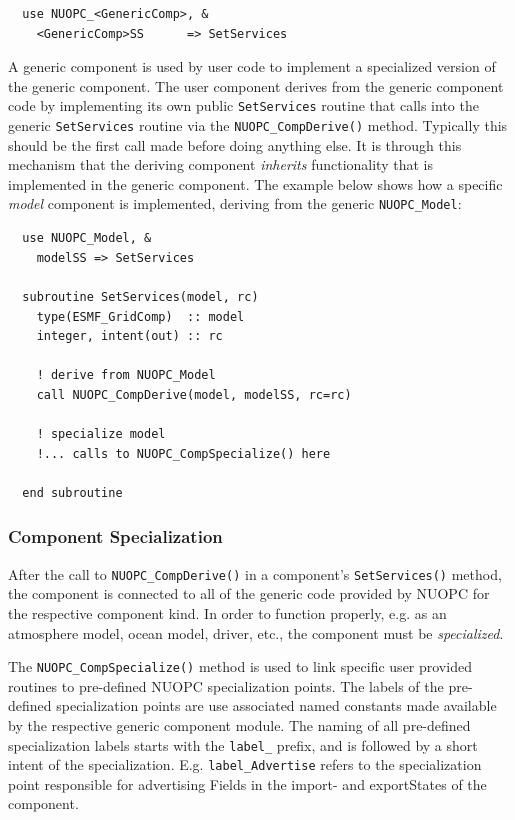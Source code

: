 \begin{verbatim}
  use NUOPC_<GenericComp>, &
    <GenericComp>SS      => SetServices
\end{verbatim}

A generic component is used by user code to implement a specialized version of the generic component. The user component derives from the generic component code by implementing its own public {\tt SetServices} routine that calls into the generic {\tt SetServices} routine via the {\tt NUOPC\_CompDerive()} method.
Typically this should be the first call made before doing anything else. It is through this mechanism that the deriving component {\em inherits} functionality that is implemented in the generic component. The example below shows how a specific {\em model} component is implemented, deriving from the generic {\tt NUOPC\_Model}:

\begin{verbatim}
  use NUOPC_Model, &
    modelSS => SetServices

  subroutine SetServices(model, rc)
    type(ESMF_GridComp)  :: model
    integer, intent(out) :: rc

    ! derive from NUOPC_Model
    call NUOPC_CompDerive(model, modelSS, rc=rc)

    ! specialize model
    !... calls to NUOPC_CompSpecialize() here
    
  end subroutine
\end{verbatim}

\subsubsection{Component Specialization}

After the call to {\tt NUOPC\_CompDerive()} in a component's {\tt SetServices()} method, the component is connected to all of the generic code provided by NUOPC for the respective component kind. In order to function properly, e.g. as an atmosphere model, ocean model, driver, etc., the component must be {\em specialized}.

The {\tt NUOPC\_CompSpecialize()} method is used to link specific user provided routines to pre-defined NUOPC specialization points. The labels of the pre-defined specialization points are use associated named constants made available by the respective generic component module. The naming of all pre-defined specialization labels starts with the {\tt label\_} prefix, and is followed by a short intent of the specialization. E.g. {\tt label\_Advertise} refers to the specialization point responsible for advertising Fields in the import- and exportStates of the component.

